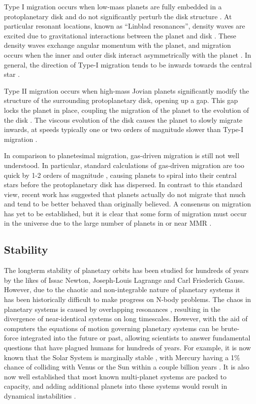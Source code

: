 Type I migration occurs when low-mass planets are fully embedded in a protoplanetary disk and do not significantly perturb the disk structure \citep{Armitage2010}. 
At particular resonant locations, known as ``Linblad resonances'', density waves are excited due to gravitational interactions between the planet and disk \citep{Goldreich1979}. 
These density waves exchange angular momentum with the planet, and migration occurs when the inner and outer disk interact asymmetrically with the planet \citep{Goldreich1979}.
In general, the direction of Type-I migration tends to be inwards towards the central star \citep{Ward1997}.

Type II migration occurs when high-mass Jovian planets significantly modify the structure of the surrounding protoplanetary disk, opening up a gap. 
This gap locks the planet in place, coupling the migration of the planet to the evolution of the disk \citep{Lin1986}.
The viscous evolution of the disk causes the planet to slowly migrate inwards, at speeds typically one or two orders of magnitude slower than Type-I migration \citep{Ward1997}.

In comparison to planetesimal migration, gas-driven migration is still not well understood. 
In particular, standard calculations of gas-driven migration are too quick by 1-2 orders of magnitude \citep{Lin1986, Tanaka2002}, causing planets to spiral into their central stars before the protoplanetary disk has dispersed.
In contrast to this standard view, recent work \citep{Fung2017} has suggested that planets actually do not migrate that much and tend to be better behaved than originally believed. 
A consensus on migration has yet to be established, but it is clear that some form of migration must occur in the universe due to the large number of planets in or near MMR \citep{Lissauer2011,Fabrycky2014,Steffen2015}.

\subsection{Stability}
\label{sec:stability}
The longterm stability of planetary orbits has been studied for hundreds of years by the likes of Issac Newton, Joseph-Louis Lagrange and Carl Friederich Gauss. 
However, due to the chaotic and non-integrable nature of planetary systems it has been historically difficult to make progress on N-body problems.  
The chaos in planetary systems is caused by overlapping resonances \citep{Chirikov1979, Lecar2001}, resulting in the divergence of near-identical systems on long timescales. 
However, with the aid of computers the equations of motion governing planetary systems can be brute-force integrated into the future or past, allowing scientists to answer fundamental questions that have plagued humans for hundreds of years. 
For example, it is now known that the Solar System is marginally stable \citep{Sussman1988, Laskar1994, Lecar2001}, with Mercury having a 1\% chance of colliding with Venus or the Sun within a couple billion years \citep{Laskar2009}.
It is also now well established that most known multi-planet systems are packed to capacity, and adding additional planets into these systems would result in dynamical instabilities \citep{Fang2013,Pu2015}.

